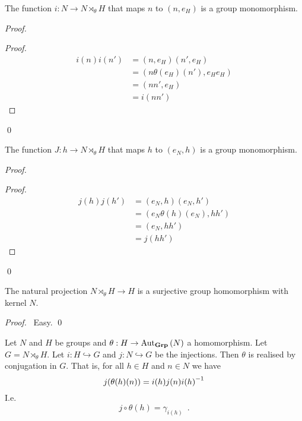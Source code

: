 \begin{prop}
The function $i : N \rightarrow N \rtimes_\theta H$ that maps $n$ to $(n,e_H)$ is a group monomorphism.
\end{prop}

\begin{proof}
\pf
{}
\begin{proof}
	\pf
	\begin{align*}
		i(n)i(n') & = (n,e_H)(n',e_H) \\
		& = (n \theta(e_H)(n'), e_H e_H) \\
		& = (nn',e_H) \\
		& = i(nn')
	\end{align*}
\end{proof}
\qed
\end{proof}

\begin{prop}
The function $J : h \rightarrow N \rtimes_\theta H$ that maps $h$ to $(e_N,h)$ is a group monomorphism.
\end{prop}

\begin{proof}
\pf
{}
\begin{proof}
	\pf
	\begin{align*}
		j(h)j(h') & = (e_N,h)(e_N,h') \\
		& = (e_N \theta(h)(e_N), hh') \\
		& = (e_N, hh') \\
		& = j(hh')
	\end{align*}
\end{proof}
\qed
\end{proof}

\begin{prop}
The natural projection $N \rtimes_\theta H \rightarrow H$ is a surjective group homomorphism with kernel $N$.
\end{prop}

\begin{proof}
\pf\ Easy. \qed
\end{proof}

\begin{prop}
Let $N$ and $H$ be groups and $\theta : H \rightarrow \mathrm{Aut}_{\mathbf{Grp}} \left( {N} \right)$ a homomorphism. Let $G = N \rtimes_\theta H$. Let $i : H \hookrightarrow G$ and $j : N \hookrightarrow G$ be the injections. Then $\theta$ is realised by conjugation in $G$. That is, for all $h \in H$ and $n \in N$ we have
\[ j(\theta(h)(n)) = i(h) j(n) {i(h)}^{-1} \]
I.e.
\[ j \circ \theta(h) = \gamma_{i(h)} \enspace . \]
\end{prop}

